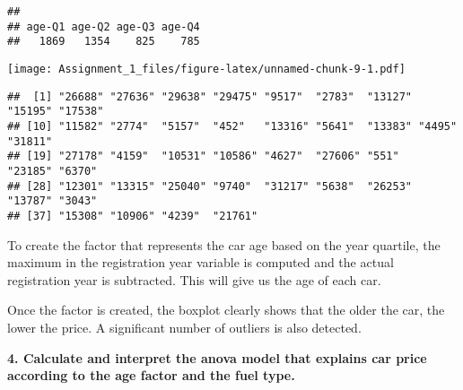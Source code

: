 \documentclass[
]{article}
\newenvironment{Shaded}{\begin{snugshade}}{\end{snugshade}}
\newcommand{\AttributeTok}[1]{\textcolor[rgb]{0.77,0.63,0.00}{#1}}
\newcommand{\FunctionTok}[1]{\textcolor[rgb]{0.00,0.00,0.00}{#1}}
\newcommand{\NormalTok}[1]{#1}
\newcommand{\OtherTok}[1]{\textcolor[rgb]{0.56,0.35,0.01}{#1}}
\newcommand{\SpecialCharTok}[1]{\textcolor[rgb]{0.00,0.00,0.00}{#1}}
\newcommand{\StringTok}[1]{\textcolor[rgb]{0.31,0.60,0.02}{#1}}
\begin{document}
\begin{verbatim}
## 
## age-Q1 age-Q2 age-Q3 age-Q4 
##   1869   1354    825    785
\end{verbatim}

\begin{Shaded}
\end{Shaded}

\texttt{[image: Assignment\_1\_files/figure-latex/unnamed-chunk-9-1.pdf]}

\begin{verbatim}
##  [1] "26688" "27636" "29638" "29475" "9517"  "2783"  "13127" "15195" "17538"
## [10] "11582" "2774"  "5157"  "452"   "13316" "5641"  "13383" "4495"  "31811"
## [19] "27178" "4159"  "10531" "10586" "4627"  "27606" "551"   "23185" "6370" 
## [28] "12301" "13315" "25040" "9740"  "31217" "5638"  "26253" "13787" "3043" 
## [37] "15308" "10906" "4239"  "21761"
\end{verbatim}

To create the factor that represents the car age based on the year
quartile, the maximum in the registration year variable is computed and
the actual registration year is subtracted. This will give us the age of
each car.

Once the factor is created, the boxplot clearly shows that the older the
car, the lower the price. A significant number of outliers is also
detected.

\newpage

\textbf{4. Calculate and interpret the anova model that explains car price according to the age factor and the fuel type.}
\end{document}

